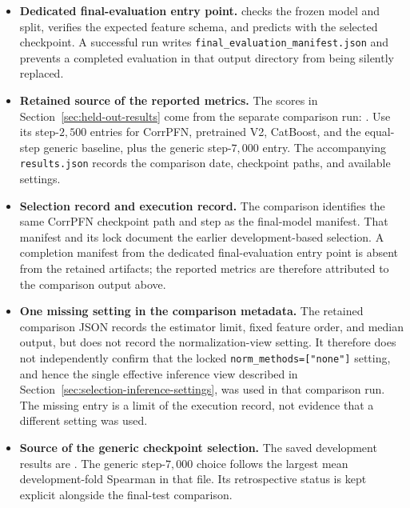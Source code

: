 \documentclass[11pt]{article}
\newenvironment{notes}
  {\begin{itemize}\setlength{\itemsep}{0.45em}\setlength{\parsep}{0pt}}
  {\end{itemize}}
\begin{document}
\begin{notes}
    \item \textbf{Dedicated final-evaluation entry point.}
    checks the frozen model and split, verifies the expected
    feature schema, and predicts with the selected checkpoint.
    A successful run writes
    \texttt{final\_evaluation\_manifest.json} and prevents
    a completed evaluation in that output directory from
    being silently replaced.

    \item \textbf{Retained source of the reported metrics.}
    The scores in Section~\ref{sec:held-out-results} come
    from the separate comparison run:
    .
    Use its step-\(2{,}500\) entries for CorrPFN, pretrained
    V2, CatBoost, and the equal-step generic baseline, plus
    the generic step-\(7{,}000\) entry.
    The accompanying \texttt{results.json} records the
    comparison date, checkpoint paths, and available settings.

    \item \textbf{Selection record and execution record.}
    The comparison identifies the same CorrPFN checkpoint
    path and step as the final-model manifest.
    That manifest and its lock document the earlier
    development-based selection.
    A completion manifest from the dedicated final-evaluation
    entry point is absent from the retained artifacts;
    the reported metrics are therefore attributed to the
    comparison output above.

    \item \textbf{One missing setting in the comparison metadata.}
    The retained comparison JSON records the estimator limit,
    fixed feature order, and median output, but does not
    record the normalization-view setting.
    It therefore does not independently confirm that the
    locked \texttt{norm\_methods=["none"]} setting, and hence
    the single effective inference view described in
    Section~\ref{sec:selection-inference-settings}, was
    used in that comparison run.
    The missing entry is a limit of the execution record,
    not evidence that a different setting was used.

    \item \textbf{Source of the generic checkpoint selection.}
    The saved development results are
    .
    The generic step-\(7{,}000\) choice follows the largest
    mean development-fold Spearman in that file.
    Its retrospective status is kept explicit alongside
    the final-test comparison.
\end{notes}
\end{document}
